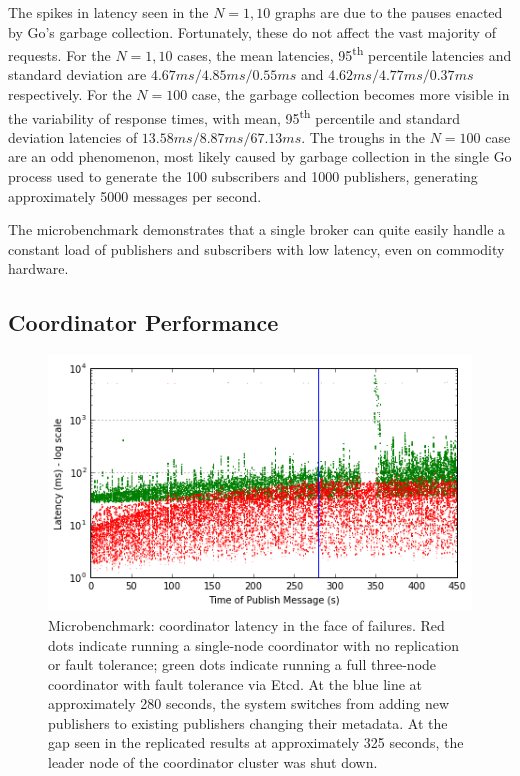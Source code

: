 The spikes in latency seen in the $N=1,10$ graphs are due to the pauses enacted by Go's garbage collection.
Fortunately, these do not affect the vast majority of requests.
For the $N=1,10$ cases, the mean latencies, 95\textsuperscript{th} percentile latencies and standard deviation are $4.67ms/4.85ms/0.55ms$ and $4.62ms/4.77ms/0.37ms$ respectively.
For the $N=100$ case, the garbage collection becomes more visible in the variability of response times, with mean, 95\textsuperscript{th} percentile and standard deviation latencies of $13.58ms/8.87ms/67.13ms$.
The troughs in the $N=100$ case are an odd phenomenon, most likely caused by garbage collection in the single Go process used to generate the 100 subscribers and 1000 publishers, generating approximately 5000 messages per second.

The microbenchmark demonstrates that a single broker can quite easily handle a constant load of publishers and subscribers with low latency, even on commodity hardware.

\subsection{Coordinator Performance}

\begin{figure}[t]
\centering
\includegraphics[width=\linewidth]{figs/coordinator_performance.png}
\caption{Microbenchmark: coordinator latency in the face of failures.
Red dots indicate running a single-node coordinator with no replication or fault tolerance; green dots indicate running a full three-node coordinator with fault tolerance via Etcd.
At the blue line at approximately 280 seconds, the system switches from adding new publishers to existing publishers changing their metadata.
At the gap seen in the replicated results at approximately 325 seconds, the leader node of the coordinator cluster was shut down.}
\label{fig:coordinator_performance}
\end{figure}

